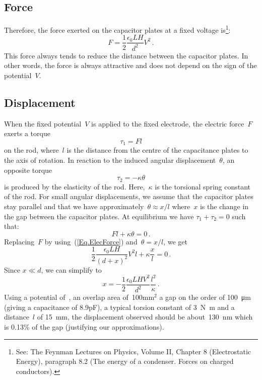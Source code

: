 \subsection{Force}
Therefore, the force exerted on the capacitor plates at a fixed voltage is\footnote{See: The Feynman Lectures on Physics, Volume II, Chapter 8 (Electrostatic Energy), paragraph 8.2 (The energy of a condenser. Forces on charged conductors).}:
\begin{equation}
F = \frac{1}{2} \frac{\epsilon_0 L H}{d^2} V^2 \,.
\label{Eq.ElecForce}
\end{equation}
This force always tends to reduce the distance between the capacitor plates.
In other words, the force is always attractive and does not depend on the sign of the potential~$V$.

\subsection{Displacement}
\label{sec.displacement}
When the fixed potential~$V$ is applied to the fixed electrode, the electric force~$F$ exerts a torque
\begin{equation}
\tau_1 = F l
\end{equation}
on the rod, where~$l$ is the distance from the centre of the capacitance plates to the axis of rotation. In reaction to the induced angular displacement~$\theta$, an opposite torque
\begin{equation}
\tau_2 = -\kappa \theta
\end{equation}
is produced by the elasticity of the rod. Here,~$\kappa$ is the torsional spring constant of the rod. For small angular displacements, we assume that the capacitor plates stay parallel and that we have approximately~$\theta \approx x/l$ where~$x$ is the change in the gap between the capacitor plates. At equilibrium we have $\tau_1+\tau_2 = 0$ such that:
\begin{equation}
\label{eq.static_equilibrium}
F l + \kappa \theta = 0\,.
\end{equation}
Replacing~$F$ by using~(\ref{Eq.ElecForce}) and~$\theta = x/l$, we get
\begin{equation}
\frac{1}{2} \frac{\epsilon_0 L H}{(d+x)^2} V^2 l + \kappa \frac{x}{l} = 0 \,.
\end{equation}
Since $x\ll d$, we can simplify to
\begin{equation}
x = - \frac{1}{2} \frac{\epsilon_0 L H V^2}{d^2} \frac{l^2}{\kappa} \,.
\end{equation}
Using a potential of~\drivepotential, an overlap area of~100mm$^2$
a gap on the order of \si{\num{100}\micro\meter} (giving a capacitance of 8.9pF), a typical torsion constant of \si{\num{3}\newton\meter} and a distance~$l$ of \si{\num{15}\milli\meter}, the displacement observed should be about~\si{\num{130}\nano\meter} which is 0.13\% of the gap (justifying our approximations).


